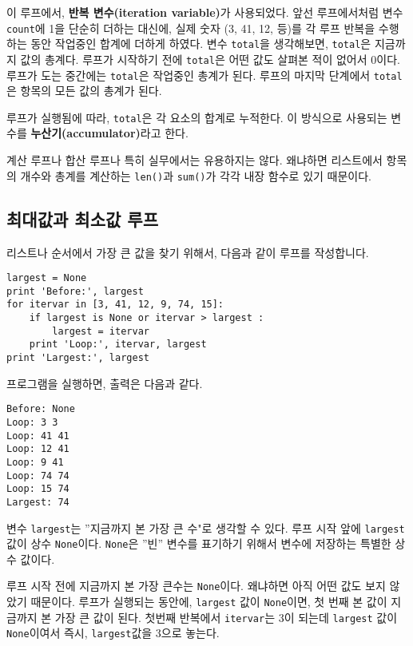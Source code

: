 이 루프에서, {\bf 반복 변수(iteration variable)}가 사용되었다. 앞선 루프에서처럼 변수 {\tt count}에 1을 단순히 더하는 대신에,
실제 숫자 (3, 41, 12, 등)를 각 루프 반복을 수행하는 동안 작업중인 합계에 더하게 하였다. 
변수 {\tt total}을 생각해보면, {\tt total}은 지금까지 값의 총계다. 루프가 시작하기 전에 {\tt total}은 어떤 값도 살펴본 적이 없어서
0이다. 루프가 도는 중간에는 {\tt total}은 작업중인 총계가 된다. 루프의 마지막 단계에서 {\tt total}은 항목의 모든 값의 총계가 된다.

루프가 실행됨에 따라, {\tt total}은 각 요소의 합계로 누적한다. 이 방식으로 사용되는 변수를 {\bf 누산기(accumulator)}라고 한다.


계산 루프나 합산 루프나 특히 실무에서는 유용하지는 않다. 왜냐하면 리스트에서 항목의 개수와 총계를 계산하는 
{\tt len()}과 {\tt sum()}가 각각 내장 함수로 있기 때문이다.

\subsection{최대값과 최소값 루프}

\label{maximumloop}

리스트나 순서에서 가장 큰 값을 찾기 위해서, 다음과 같이 루프를 작성합니다.

\beforeverb
\begin{verbatim}
largest = None
print 'Before:', largest
for itervar in [3, 41, 12, 9, 74, 15]:
    if largest is None or itervar > largest :
        largest = itervar
    print 'Loop:', itervar, largest
print 'Largest:', largest
\end{verbatim}
\afterverb
%
프로그램을 실행하면, 출력은 다음과 같다.

\beforeverb
\begin{verbatim}
Before: None
Loop: 3 3
Loop: 41 41
Loop: 12 41
Loop: 9 41
Loop: 74 74
Loop: 15 74
Largest: 74
\end{verbatim}
\afterverb
%

변수 {\tt largest}는 ''지금까지 본 가장 큰 수"로 생각할 수 있다.
루프 시작 앞에 {\tt largest} 값이 상수 {\tt None}이다.
{\tt None}은 ''빈'' 변수를 표기하기 위해서 변수에 저장하는 특별한 상수 값이다.

루프 시작 전에 지금까지 본 가장 큰수는 {\tt None}이다. 왜냐하면 아직 어떤 값도 보지 않았기 때문이다.
루프가 실행되는 동안에, {\tt largest} 값이 {\tt None}이면, 첫 번째 본 값이 지금까지 본 가장 큰 값이 된다.
첫번째 반복에서 {\tt itervar}는 3이 되는데 {\tt largest} 값이 {\tt None}이여서 즉시, {\tt largest}값을 3으로 놓는다.

